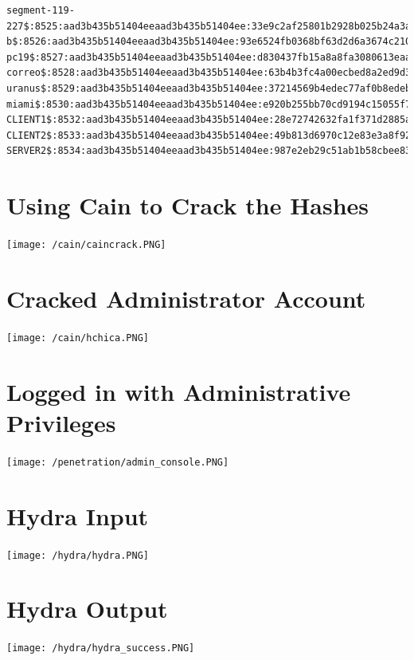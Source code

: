\documentclass[12pt,a4paper]{article}
\begin{document}
\begin{appendices}
\begin{lstlisting}
segment-119-227$:8525:aad3b435b51404eeaad3b435b51404ee:33e9c2af25801b2928b025b24a3a1138:::
b$:8526:aad3b435b51404eeaad3b435b51404ee:93e6524fb0368bf63d2d6a3674c210ab:::
pc19$:8527:aad3b435b51404eeaad3b435b51404ee:d830437fb15a8a8fa3080613eaadbefe:::
correo$:8528:aad3b435b51404eeaad3b435b51404ee:63b4b3fc4a00ecbed8a2ed9d35072a86:::
uranus$:8529:aad3b435b51404eeaad3b435b51404ee:37214569b4edec77af0b8edeb18342c2:::
miami$:8530:aad3b435b51404eeaad3b435b51404ee:e920b255bb70cd9194c15055f7925155:::
CLIENT1$:8532:aad3b435b51404eeaad3b435b51404ee:28e72742632fa1f371d2885a12e69a95:::
CLIENT2$:8533:aad3b435b51404eeaad3b435b51404ee:49b813d6970c12e83e3a8f927d81ea1a:::
SERVER2$:8534:aad3b435b51404eeaad3b435b51404ee:987e2eb29c51ab1b58cbee8392ca8321:::
		\end{lstlisting}
	\section{Using Cain to Crack the Hashes}
		\texttt{[image: /cain/caincrack.PNG]}
	\section{Cracked Administrator Account}
		\texttt{[image: /cain/hchica.PNG]}
	\section{Logged in with Administrative Privileges}
		\texttt{[image: /penetration/admin\_console.PNG]}
	\section{Hydra Input}
		\texttt{[image: /hydra/hydra.PNG]}
	\section{Hydra Output}
		\texttt{[image: /hydra/hydra\_success.PNG]}

	\end{appendices}

\end{document}
